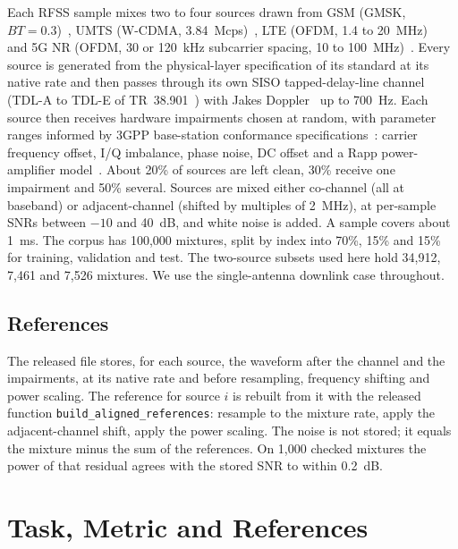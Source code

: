 \documentclass[conference]{IEEEtran}
\begin{document}
Each RFSS sample mixes two to four sources drawn from GSM (GMSK, $BT\!=\!0.3$)~\cite{3gpp45004}, UMTS
(W-CDMA, 3.84~Mcps)~\cite{3gpp25211}, LTE (OFDM, 1.4 to 20~MHz)~\cite{3gpp36211} and 5G NR
(OFDM, 30 or 120~kHz subcarrier spacing, 10 to 100~MHz)~\cite{3gpp38211}. Every source is generated from the
physical-layer specification of its standard at its native rate and then passes through its own SISO tapped-delay-line
channel (TDL-A to TDL-E of TR~38.901~\cite{3gpp38901}) with Jakes Doppler~\cite{jakes1994microwave} up to 700~Hz.
Each source then receives hardware impairments chosen at random, with parameter ranges informed by 3GPP base-station
conformance specifications~\cite{3gpp38104,3gpp36104,3gpp25104}: carrier frequency offset, I/Q imbalance, phase noise,
DC offset and a Rapp power-amplifier model~\cite{rapp1991effects}. About 20\% of sources are left clean, 30\% receive one
impairment and 50\% several. Sources are mixed either co-channel (all at baseband) or adjacent-channel (shifted by
multiples of 2~MHz), at per-sample SNRs between $-10$ and 40~dB, and white noise is added. A sample covers about 1~ms.
The corpus has 100,000 mixtures, split by index into 70\%, 15\% and 15\% for training, validation and test.
The two-source subsets used here hold 34,912, 7,461 and 7,526 mixtures. We use the single-antenna downlink
case throughout.

\subsection{References}

The released file stores, for each source, the waveform after the channel and the impairments, at its native rate
and before resampling, frequency shifting and power scaling. The reference for source $i$ is rebuilt from it with the
released function \texttt{build\_aligned\_references}: resample to the mixture rate, apply the adjacent-channel shift, apply the power
scaling. The noise is not stored; it equals the mixture minus the sum of the references. On 1,000 checked mixtures the
power of that residual agrees with the stored SNR to within 0.2~dB.

\section{Task, Metric and References}
\label{sec:task}
\end{document}
